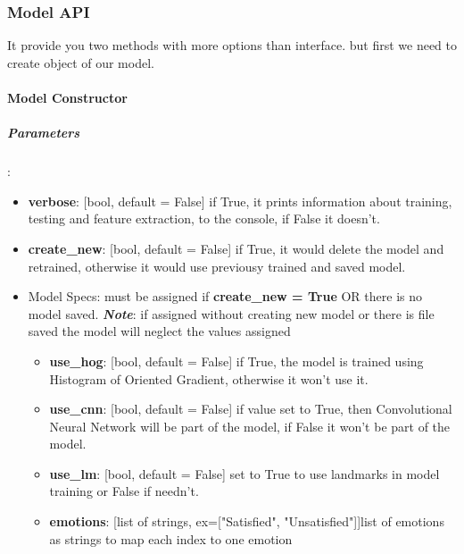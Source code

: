 
\subsubsection{Model API}
It provide you two methods with more options than interface.\newline
but first we need to create object of our model.
\bigbreak

\paragraph{Model Constructor}

\subparagraph{Parameters}:
\begin{changemargin}{0.5cm}{0cm}
\begin{itemize}
	\item \textbf{verbose}: [bool, default = False] if True, it prints information about training, testing and feature extraction, to the console, if False it doesn't.
	
	\item \textbf{create\_new}: [bool, default = False] if True, it would delete the model and retrained, otherwise it would use previousy trained and saved model.
	
	\item Model Specs: must be assigned if \textbf{create\_new = True} OR there is no model saved.
		\newline
		\textbf{\textit{Note}}: if assigned without creating new model or there is file saved the model will neglect the values assigned
		\begin{itemize}
			\item \textbf{use\_hog}: [bool, default = False] if True, the model is trained using  Histogram of Oriented Gradient, otherwise it won't use it.

			\item \textbf{use\_cnn}: [bool, default = False] if value set to True, then Convolutional Neural Network will be part of the model, if False it won't be part of the model.
			
			\item \textbf{use\_lm}: [bool, default = False] set to True to use landmarks in model training or False if needn't.
			
			\item \textbf{emotions}: [list of strings, ex=["Satisfied", "Unsatisfied"]]list of emotions as strings to map each index to one emotion 
		\end{itemize}
		
\end{itemize}
\end{changemargin}

